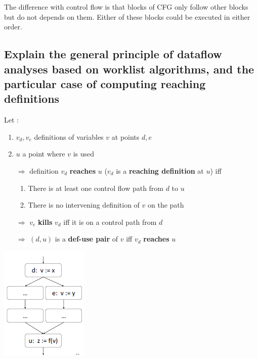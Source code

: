\documentclass{article}
\begin{document}
The difference with control flow is that blocks of CFG only follow other blocks but do not depends on them. Either of these blocks could be executed in either order.

\subsection{Explain the general principle of dataflow analyses based on worklist algorithms, and the particular case of computing reaching definitions}
\vspace{-0.5cm}
\begin{multicols}{2}
\noindent Let :
\begin{enumerate}
    \item $v_d, v_e$ definitions of variables $v$ at points $d,e$
    \item $u$ a point where $v$ is used
    \item[$\Rightarrow$]definition $v_d$ \textbf{reaches} $u$ ($v_d$ is a \textbf{reaching definition} at $u$) iff 
    \begin{enumerate}
        \item There is at least one control flow path from $d$ to $u$
        \item There is no intervening definition of $v$ on the path
    \end{enumerate}
    \item[$\Rightarrow$]$v_e$ \textbf{kills} $v_d$ iff it is on a control path from $d$
    \item[$\Rightarrow$]$(d,u)$ is a \textbf{def-use pair} of $v$ iff $v_d$ \textbf{reaches} $u$
\end{enumerate}
\columnbreak
\vfill\null
\begin{center}
    \includegraphics[scale = 0.8]{image/11.PNG}
\end{center}
\end{multicols}
\end{document}
